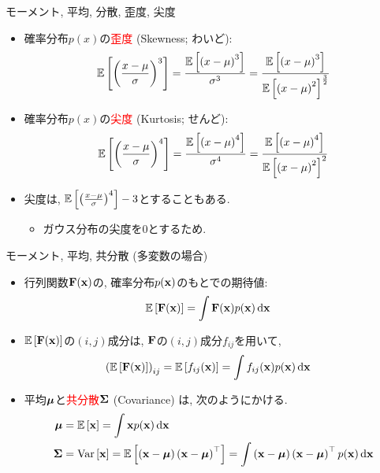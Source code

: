 \documentclass[dvipdfmx,notheorems,t]{beamer}
\begin{document}
\begin{frame}{モーメント, 平均, 分散, 歪度, 尖度}
\begin{itemize}
  \item 確率分布$p(x)$の\textcolor{red}{歪度} (Skewness; わいど):
  \begin{align*}
    \operatorname{\mathbb{E}} \left[ \left( \frac{x - \mu}{\sigma} \right)^3 \right] = \frac{\operatorname{\mathbb{E}} \left[ \left( x - \mu \right)^3 \right]}{\sigma^3}
      = \frac{\operatorname{\mathbb{E}} \left[ \left( x - \mu \right)^3 \right]}{\operatorname{\mathbb{E}} \left[ \left( x - \mu \right)^2 \right]^\frac{3}{2}}
  \end{align*}
  \item 確率分布$p(x)$の\textcolor{red}{尖度} (Kurtosis; せんど):
  \begin{align*}
    \operatorname{\mathbb{E}} \left[ \left( \frac{x - \mu}{\sigma} \right)^4 \right] = \frac{\operatorname{\mathbb{E}} \left[ \left( x - \mu \right)^4 \right]}{\sigma^4}
      = \frac{\operatorname{\mathbb{E}} \left[ \left( x - \mu \right)^4 \right]}{\operatorname{\mathbb{E}} \left[ \left( x - \mu \right)^2 \right]^2}
  \end{align*}
  \item 尖度は, $\operatorname{\mathbb{E}} \left[ \left( \frac{x - \mu}{\sigma} \right)^4 \right] - 3$とすることもある.
  \begin{itemize}
    \item ガウス分布の尖度を$0$とするため.
  \end{itemize}
\end{itemize}
\end{frame}

\begin{frame}{モーメント, 平均, 共分散 (多変数の場合)}
\begin{itemize}
  \item 行列関数$\vb{F}(\vb{x})$の, 確率分布$p(\vb{x})$のもとでの期待値:
  \begin{align*}
    \operatorname{\mathbb{E}} \left[ \vb{F}(\vb{x}) \right] &= \int \vb{F}(\vb{x}) p(\vb{x}) \dd{\vb{x}}
  \end{align*}
  \item $\operatorname{\mathbb{E}} \left[ \vb{F}(\vb{x}) \right]$の$(i, j)$成分は, $\vb{F}$の$(i, j)$成分$f_{ij}$を用いて,
  \begin{align*}
    \left( \operatorname{\mathbb{E}} \left[ \vb{F}(\vb{x}) \right] \right)_{ij} &= \operatorname{\mathbb{E}} \left[ f_{ij}(\vb{x}) \right]
      = \int f_{ij}(\vb{x}) p(\vb{x}) \dd{\vb{x}}
  \end{align*}
  \item 平均$\vb*{\mu}$と\textcolor{red}{共分散}$\vb{\Sigma}$ (Covariance) は, 次のようにかける.
  \begin{align*}
    \vb*{\mu} &= \operatorname{\mathbb{E}} \left[ \vb{x} \right] = \int \vb{x} p(\vb{x}) \dd{\vb{x}} \\
    \vb{\Sigma} &= \operatorname{Var} \left[ \vb{x} \right] = \operatorname{\mathbb{E}} \left[ \left( \vb{x} - \vb*{\mu} \right) \left( \vb{x} - \vb*{\mu} \right)^\top \right]
      = \int \left( \vb{x} - \vb*{\mu} \right) \left( \vb{x} - \vb*{\mu} \right)^\top p(\vb{x}) \dd{\vb{x}}
  \end{align*}
\end{itemize}
\end{frame}
\end{document}
